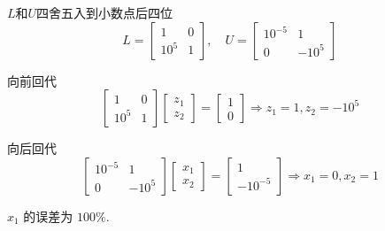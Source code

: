 \begin{example}
    $L$和$U$四舍五入到小数点后四位
    \begin{equation}
        L=\left[\begin{array}{cc}
                1      & 0 \\
                10^{5} & 1
            \end{array}\right], \quad U=\left[\begin{array}{cc}
                10^{-5} & 1       \\
                0       & -10^{5}
            \end{array}\right]
    \end{equation}

    向前回代
    \begin{equation}
        \left[\begin{array}{cc}
                1      & 0 \\
                10^{5} & 1
            \end{array}\right]\left[\begin{array}{l}
                z_{1} \\
                z_{2}
            \end{array}\right]=\left[\begin{array}{l}
                1 \\
                0
            \end{array}\right] \Rightarrow z_{1}=1, z_{2}=-10^{5}
    \end{equation}

    向后回代
    \begin{equation}
        \left[\begin{array}{cc}
                10^{-5} & 1       \\
                0       & -10^{5}
            \end{array}\right]\left[\begin{array}{l}
                x_{1} \\
                x_{2}
            \end{array}\right]=\left[\begin{array}{l}
                1 \\
                -10^{-5}
            \end{array}\right] \Rightarrow x_{1}=0, x_{2}=1
    \end{equation}

    \begin{remark}
        $ x_{1} $ 的误差为 $ 100 \% $.
    \end{remark}




\end{example}
